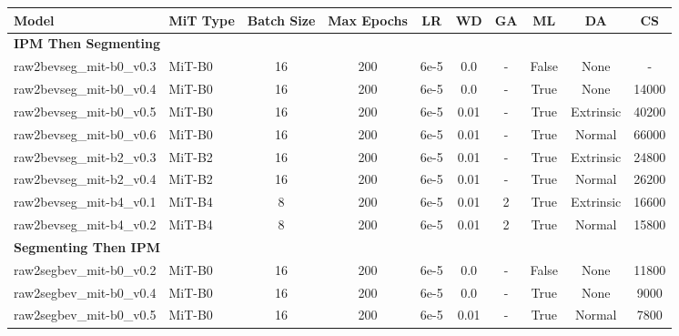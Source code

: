 \begin{table}[h!]
    \centering
    \begin{threeparttable} %
        \tiny
        \begin{tabular}{l l | c c c c c c c c}
            \toprule
            \textbf{Model} & \textbf{MiT Type} & \textbf{Batch Size} & \textbf{Max Epochs} & \textbf{LR} & \textbf{WD} & \textbf{GA} & \textbf{ML} & \textbf{DA} & \textbf{CS} \\
            \midrule

            \multicolumn{10}{l}{\textbf{IPM Then Segmenting}} \\
            \midrule
            raw2bevseg\_mit-b0\_v0.3 & MiT-B0 & 16 & 200 & 6e-5 & 0.0 & - & False & None & - \\
            
            raw2bevseg\_mit-b0\_v0.4 & MiT-B0 & 16 & 200 & 6e-5 & 0.0 & - & True & None & 14000 \\

            raw2bevseg\_mit-b0\_v0.5 & MiT-B0 & 16 & 200 & 6e-5 & 0.01 & - & True & Extrinsic & 40200 \\
            raw2bevseg\_mit-b0\_v0.6 & MiT-B0 & 16 & 200 & 6e-5 & 0.01 & - & True & Normal & 66000 \\
            

            raw2bevseg\_mit-b2\_v0.3 & MiT-B2 & 16 & 200 & 6e-5 & 0.01 & - & True & Extrinsic & 24800 \\
            raw2bevseg\_mit-b2\_v0.4 & MiT-B2 & 16 & 200 & 6e-5 & 0.01 & - & True & Normal & 26200 \\
            
            raw2bevseg\_mit-b4\_v0.1 & MiT-B4 & 8 & 200 & 6e-5 & 0.01 & 2 & True & Extrinsic & 16600 \\
            raw2bevseg\_mit-b4\_v0.2 & MiT-B4 & 8 & 200 & 6e-5 & 0.01 & 2 & True & Normal & 15800 \\
            
            \midrule[1pt]
            \multicolumn{10}{l}{\textbf{Segmenting Then IPM}} \\
            \midrule
            raw2segbev\_mit-b0\_v0.2 & MiT-B0 & 16 & 200 & 6e-5 & 0.0 & - & False & None & 11800 \\
            
            raw2segbev\_mit-b0\_v0.4 & MiT-B0 & 16 & 200 & 6e-5 & 0.0 & - & True & None & 9000 \\
            raw2segbev\_mit-b0\_v0.5 & MiT-B0 & 16 & 200 & 6e-5 & 0.01 & - & True & Normal & 7800 \\
            

\end{tabular}
\end{threeparttable}
\end{table}
